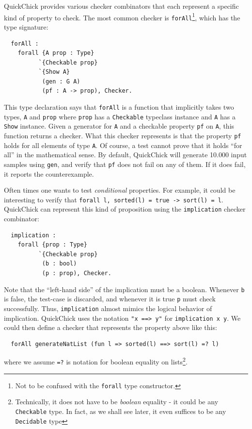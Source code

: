 \documentclass[twoside,11pt,openright]{report}
\newenvironment{code}{\captionsetup{type=figure, singlelinecheck=off, justification=raggedleft}}{}
\newcommand{\coq}[1]{\texttt{#1}}
\begin{document}
QuickChick provides various checker combinators that each represent a specific kind of property to check. The most common checker is \coq{forAll}\footnote{Not to be confused with the \coq{forall} type constructor.}, which has the type signature:
\begin{code}
\label{def:forAll}
\begin{verbatim}
  forAll :
    forall {A prop : Type} 
          `{Checkable prop} 
          `{Show A}
           (gen : G A)
           (pf : A -> prop), Checker.
\end{verbatim}
\end{code}
This type declaration says that \coq{forAll} is a function that implicitly takes two types, \coq{A} and \coq{prop} where \coq{prop} has a \coq{Checkable} typeclass instance and  \coq{A} has a \coq{Show} instance. Given a generator for \coq{A} and a checkable property \coq{pf} on \coq{A}, this function returns a checker. What this checker represents is that the property \coq{pf} holds for all elements of type \coq{A}. Of course, a test cannot prove that it holds ``for all'' in the mathematical sense. By default, QuickChick will generate 10.000 input samples using \coq{gen}, and verify that \coq{pf} does not fail on any of them. If it does fail, it reports the counterexample. 

Often times one wants to test \textit{conditional} properties. For example, it could be interesting to verify that \coq{forall l, sorted(l) = true -> sort(l) = l}. QuickChick can represent this kind of proposition using the \coq{implication} checker combinator:
\begin{code}
\label{def:implication}
\begin{verbatim}
  implication :
    forall {prop : Type} 
          `{Checkable prop} 
           (b : bool)
           (p : prop), Checker.
\end{verbatim}
\end{code}
Note that the ``left-hand side'' of the implication must be a boolean. Whenever \coq{b} is false, the test-case is discarded, and whenever it is true \coq{p} must check successfully. Thus, \coq{implication} almost mimics the logical behavior of implication. QuickChick uses the notation \coq{"x ==> y"} for \coq{implication x y}. We could then define a checker that represents the property above like this:
\begin{code}\begin{verbatim}
  forAll generateNatList (fun l => sorted(l) ==> sort(l) =? l) 
\end{verbatim}
\end{code}
where we assume \coq{=?} is notation for boolean equality on lists\footnote{Technically, it does not have to be \textit{boolean} equality - it could be any \coq{Checkable} type. In fact, as we shall see later, it even suffices to be any \coq{Decidable} type}.
\end{document}
